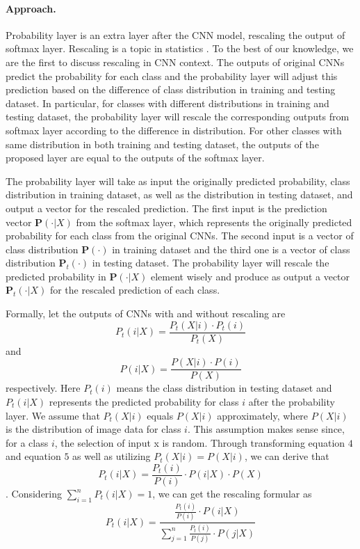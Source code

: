 \documentclass[pageno]{jpaper}
\begin{document}
\paragraph{Approach. } Probability layer is an extra layer after the CNN model, rescaling the output of softmax layer. Rescaling is a topic in statistics \cite{saerens2002adjusting}. To the best of our knowledge, we are the first to discuss rescaling in CNN context. The outputs of original CNNs predict the probability for each class and the probability layer will adjust this prediction based on the difference of class distribution in training and testing dataset. In particular, for classes with different distributions in training and testing dataset, the probability layer will rescale the corresponding outputs from softmax layer according to the difference in distribution. For other classes with same distribution in both training and testing dataset, the outputs of the proposed layer are equal to the outputs of the softmax layer. 


The probability layer will take as input the originally predicted probability, class distribution in training dataset, as well as the distribution in testing dataset, and output a vector for the rescaled prediction. The first input is the prediction vector $\mathbf{P}(\cdot|X)$ from the softmax layer, which represents the originally predicted probability for each class from the original CNNs. The second input is a vector of class distribution $\mathbf{P}(\cdot)$ in training dataset and the third one is a vector of class distribution $\mathbf{P}_t(\cdot)$ in testing dataset. The probability layer will rescale the predicted probability in $\mathbf{P}(\cdot|X)$ element wisely and produce as output a vector $\mathbf{P}_t(\cdot|X)$ for the rescaled prediction of each class.

Formally, let the outputs of CNNs with and without rescaling are
\begin{equation}
    P_t(i|X) = \frac{P_t(X|i) \cdot P_t(i)}{P_t(X)}
\end{equation}
and
\begin{equation}
    P(i|X) = \frac{P(X|i) \cdot P(i)}{P(X)}
\end{equation}
respectively. Here $P_t(i)$ means the class distribution in testing dataset and $P_t(i|X)$ represents the predicted probability for class $i$ after the probability layer. We assume that $P_t(X|i)$ equals $P(X|i)$ approximately, where $P(X|i)$ is the distribution of image data for class $i$. This assumption makes sense since, for a class $i$, the selection of input x is random. Through transforming equation $4$ and equation $5$ as well as utilizing $P_t(X|i) = P(X|i)$, we can derive that 
\begin{equation}
    P_t(i|X) = \frac{P_t(i)}{P(i)}\cdot P(i|X) \cdot P(X) 
\end{equation}. Considering $\sum_{i=1}^n P_t(i|X) = 1$, we can get the rescaling formular as
\begin{equation}
    P_t(i|X) = \frac{\frac{P_t(i)}{P(i)} \cdot P(i|X)}{\sum_{j=1}^n \frac{P_t(i)}{P(j)} \cdot P(j|X)}
\end{equation}
\end{document}
